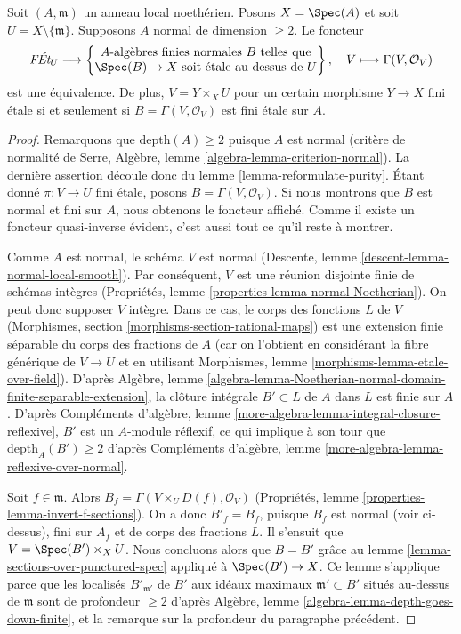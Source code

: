 \begin{lemma}
\label{lemma-reformulate-purity-normal}
Soit $(A, \mathfrak m)$ un anneau local noethérien. Posons $X = \Spec(A)$
et soit $U = X \setminus \{\mathfrak m\}$. Supposons $A$ normal
de dimension $\geq 2$. Le foncteur
$$
\textit{F\'Et}_U \longrightarrow
\left\{
\begin{matrix}
A\text{-algèbres finies normales }B\text{ telles que} \\
\Spec(B) \to X\text{ soit étale au-dessus de }U
\end{matrix}
\right\},
\quad
V \longmapsto \Gamma(V, \mathcal{O}_V)
$$
est une équivalence. De plus, $V = Y \times_X U$ pour un certain morphisme $Y \to X$
fini étale si et seulement si $B = \Gamma(V, \mathcal{O}_V)$
est fini étale sur $A$.
\end{lemma}

\begin{proof}
Remarquons que $\text{depth}(A) \geq 2$ puisque $A$ est normal
(critère de normalité de Serre, Algèbre, lemme
\ref{algebra-lemma-criterion-normal}).
La dernière assertion découle donc du lemme \ref{lemma-reformulate-purity}.
Étant donné $\pi : V \to U$ fini étale, posons $B = \Gamma(V, \mathcal{O}_V)$.
Si nous montrons que $B$ est normal et fini sur $A$, nous
obtenons le foncteur affiché. Comme il existe un foncteur quasi-inverse
évident, c'est aussi tout ce qu'il reste à montrer.

\medskip\noindent
Comme $A$ est normal, le schéma $V$ est normal
(Descente, lemme \ref{descent-lemma-normal-local-smooth}).
Par conséquent, $V$ est une réunion disjointe finie de schémas intègres
(Propriétés, lemme \ref{properties-lemma-normal-Noetherian}).
On peut donc supposer $V$ intègre.
Dans ce cas, le corps des fonctions $L$ de $V$
(Morphismes, section \ref{morphisms-section-rational-maps})
est une extension finie séparable du corps des fractions de $A$
(car on l'obtient en considérant la fibre générique
de $V \to U$ et en utilisant Morphismes, lemme
\ref{morphisms-lemma-etale-over-field}).
D'après Algèbre, lemme
\ref{algebra-lemma-Noetherian-normal-domain-finite-separable-extension},
la clôture intégrale $B' \subset L$ de $A$ dans $L$ est finie sur $A$.
D'après Compléments d'algèbre, lemme \ref{more-algebra-lemma-integral-closure-reflexive},
$B'$ est un $A$-module réflexif, ce qui implique à son tour
que $\text{depth}_A(B') \geq 2$ d'après
Compléments d'algèbre, lemme \ref{more-algebra-lemma-reflexive-over-normal}.

\medskip\noindent
Soit $f \in \mathfrak m$. Alors $B_f = \Gamma(V \times_U D(f), \mathcal{O}_V)$
(Propriétés, lemme \ref{properties-lemma-invert-f-sections}).
On a donc $B'_f = B_f$, puisque $B_f$ est normal (voir ci-dessus),
fini sur $A_f$ et de corps des fractions $L$.
Il s'ensuit que $V = \Spec(B') \times_X U$.
Nous concluons alors que $B = B'$ grâce au
lemme \ref{lemma-sections-over-punctured-spec}
appliqué à $\Spec(B') \to X$.
Ce lemme s'applique parce que les localisés $B'_{\mathfrak m'}$
de $B'$ aux idéaux maximaux $\mathfrak m' \subset B'$ situés au-dessus de
$\mathfrak m$ sont de profondeur $\geq 2$ d'après
Algèbre, lemme \ref{algebra-lemma-depth-goes-down-finite},
et la remarque sur la profondeur du paragraphe précédent.
\end{proof}

